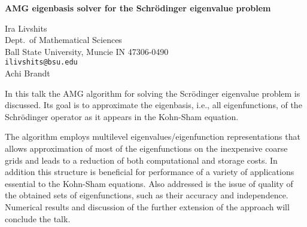 \documentclass{report}
\begin{document}

\begin{center}
{\large
{\bf AMG eigenbasis solver for the Schr\"{o}dinger eigenvalue problem}}

	Ira Livshits \\
	Dept.~of Mathematical Sciences \\
	Ball State University, Muncie IN 47306-0490 \\
	{\tt ilivshits@bsu.edu} \\
	Achi Brandt
\end{center}
In this talk the AMG algorithm for solving the
Scr\"{o}dinger eigenvalue problem is discussed. Its goal is
to approximate the eigenbasis, i.e., all eigenfunctions, of
the Schr\"{o}dinger operator as it appears in the Kohn-Sham
equation.

The algorithm employs multilevel
eigenvalues/eigenfunction representations that allows
approximation of most of the eigenfunctions on the
inexpensive coarse grids and leads to a reduction of both
computational and storage costs. In addition this structure
is beneficial for performance of a variety of applications
essential to the Kohn-Sham equations. Also addressed is the
issue of quality of the obtained sets of eigenfunctions,
such as their accuracy and independence. Numerical results
and discussion of the further extension of the approach will
conclude the talk.



\end{document}
